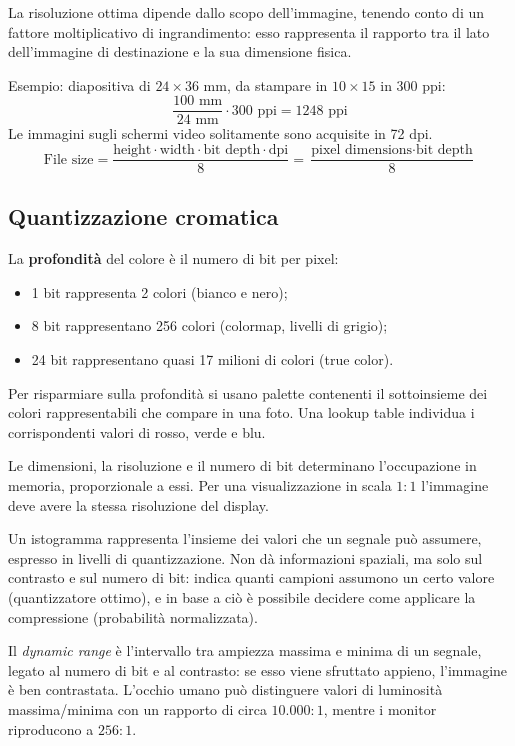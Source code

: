 La risoluzione ottima dipende dallo scopo dell'immagine, tenendo conto di un fattore moltiplicativo di ingrandimento: esso rappresenta il rapporto tra il lato dell'immagine di destinazione e la sua dimensione fisica.

Esempio: diapositiva di $24\times36$ mm, da stampare in $10\times15$ in 300 ppi:
$$\frac{100\text{ mm}}{24\text{ mm}} \cdot 300\text{ ppi} = 1248 \text{ ppi}$$
Le immagini sugli schermi video solitamente sono acquisite in 72 dpi.
$$ \text{File size} = \frac{\text{height} \cdot \text{width} \cdot \text{bit depth} \cdot \text{dpi}}{8} = \frac{\text{pixel dimensions} \cdot \text{bit depth}}{8}$$

\subsection{Quantizzazione cromatica}
La \textbf{profondità} del colore è il numero di bit per pixel:
\begin{itemize}
	\item 1 bit rappresenta 2 colori (bianco e nero);
	\item 8 bit rappresentano 256 colori (colormap, livelli di grigio);
	\item 24 bit rappresentano quasi 17 milioni di colori (true color).
\end{itemize}

Per risparmiare sulla profondità si usano palette contenenti il sottoinsieme dei colori rappresentabili che compare in una foto. Una lookup table individua i corrispondenti valori di rosso, verde e blu.

Le dimensioni, la risoluzione e il numero di bit determinano l'occupazione in memoria, proporzionale a essi. Per una visualizzazione in scala $1 : 1$ l'immagine deve avere la stessa risoluzione del display.

Un istogramma rappresenta l'insieme dei valori che un segnale può assumere, espresso in livelli di quantizzazione. Non dà informazioni spaziali, ma solo sul contrasto e sul numero di bit: indica quanti campioni assumono un certo valore (quantizzatore ottimo), e in base a ciò è possibile decidere come applicare la compressione (probabilità normalizzata).

Il \textit{dynamic range} è l'intervallo tra ampiezza massima e minima di un segnale, legato al numero di bit e al contrasto: se esso viene sfruttato appieno, l'immagine è ben contrastata. L'occhio umano può distinguere valori di luminosità massima/minima con un rapporto di circa $10.000 : 1$, mentre i monitor riproducono a $256 : 1$.

